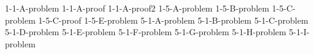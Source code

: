 \documentclass[uplatex, dvipdfmx, a4paper, 12pt, class=jsarticle, crop=false]{standalone}
\begin{document}
	{1-1-A-problem}
	{1-1-A-proof}
	{1-1-A-proof2}
	{1-5-A-problem}
	{1-5-B-problem}
	{1-5-C-problem}
	{1-5-C-proof}
	{1-5-E-problem}
	{5-1-A-problem}
	{5-1-B-problem}
	{5-1-C-problem}
	{5-1-D-problem}
	{5-1-E-problem}
	{5-1-F-problem}
	{5-1-G-problem}
	{5-1-H-problem}
	{5-1-I-problem}
\end{document}
